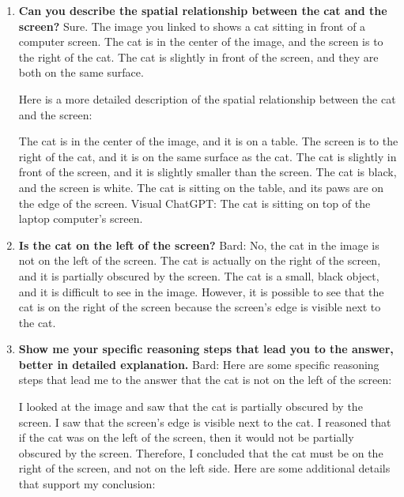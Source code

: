     \begin{enumerate}
        \item \textbf{Can you describe the spatial relationship between the cat and the screen?}
        \subitem Sure. The image you linked to shows a cat sitting in front of a computer screen. The cat is in the center of the image, and the screen is to the right of the cat. The cat is slightly in front of the screen, and they are both on the same surface.

        Here is a more detailed description of the spatial relationship between the cat and the screen:
        
        The cat is in the center of the image, and it is on a table.
        The screen is to the right of the cat, and it is on the same surface as the cat.
        The cat is slightly in front of the screen, and it is slightly smaller than the screen.
        The cat is black, and the screen is white.
        The cat is sitting on the table, and its paws are on the edge of the screen.
        \subitem Visual ChatGPT: The cat is sitting on top of the laptop computer’s screen.
        \item \textbf{Is the cat on the left of the screen?}
        \subitem Bard: 
        No, the cat in the image is not on the left of the screen. The cat is actually on the right of the screen, and it is partially obscured by the screen. The cat is a small, black object, and it is difficult to see in the image. However, it is possible to see that the cat is on the right of the screen because the screen's edge is visible next to the cat.
        \item \textbf{Show me your specific reasoning steps that lead you to the answer, better in detailed explanation.}
        \subitem Bard:
        Here are some specific reasoning steps that lead me to the answer that the cat is not on the left of the screen:

        I looked at the image and saw that the cat is partially obscured by the screen.
        I saw that the screen's edge is visible next to the cat.
        I reasoned that if the cat was on the left of the screen, then it would not be partially obscured by the screen.
        Therefore, I concluded that the cat must be on the right of the screen, and not on the left side.
        Here are some additional details that support my conclusion:


\end{enumerate}
